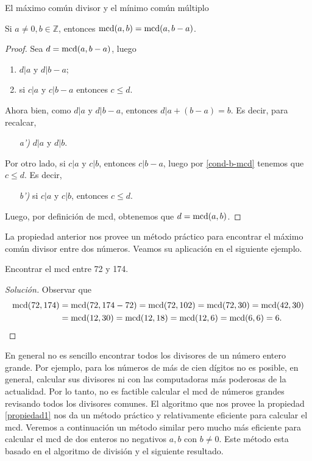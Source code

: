 \begin{section}{El máximo común divisor y el mínimo común múltiplo}
\begin{propiedad}\label{propiedad1}
    Si $a \not=0, b \in \mathbb Z$, entonces $\operatorname{mcd}(a,b) = \operatorname{mcd}(a,b-a)$. 
\end{propiedad}
\begin{proof}
    Sea $d =  \operatorname{mcd}(a,b-a)$, luego 
    \begin{enumerate}[label=\textit{\alph*)}]
        \item $ d|a$ y $d|b -a$;
        \item\label{cond-b-mcd} si $ c|a $ y $c|b -a$ entonces $ c \le d$.
    \end{enumerate}
    Ahora bien, como  $ d|a$ y $d|b -a$, entonces $  d|a +(b -a) = b$. Es decir, para recalcar,
    \begin{enumerate}
        \item[\textit{a')}] $ d|a$ y $d|b$.
    \end{enumerate}
    Por otro lado, si  $ c|a $ y $c|b$, entonces  $c|b -a$, luego por \ref{cond-b-mcd} tenemos que $c\le d$. Es decir, 
    \begin{enumerate}
        \item[\textit{b')}]si  $ c|a $ y $c|b$, entonces  $c \le d$.
    \end{enumerate}
    Luego, por definición de mcd, obtenemos que $d = \operatorname{mcd}(a,b)$.
\end{proof}

La propiedad anterior nos provee un método práctico para encontrar el máximo común divisor entre dos números. Veamos su aplicación en el siguiente ejemplo.

\begin{ejemplo*} Encontrar el mcd entre 72 y 174.
    \begin{proof}[Solución] Observar que 
        \begin{align*}
        \operatorname{mcd}(72, 174) &= \operatorname{mcd}(72,174-72) = \operatorname{mcd}(72,102) = \operatorname{mcd}(72,30) =  \operatorname{mcd}(42, 30) \\&= \operatorname{mcd}(12,30) = \operatorname{mcd}(12,18)= \operatorname{mcd}(12,6)= \operatorname{mcd}(6,6) = 6.  
        \end{align*}
    \end{proof}
\end{ejemplo*} 

En  general no es sencillo encontrar todos los divisores de un número entero grande. Por ejemplo, para los  números de más de cien dígitos no es posible,  en general, calcular sus divisores ni con las computadoras más poderosas de la actualidad. Por  lo tanto, no es factible calcular el  mcd de números grandes revisando todos los divisores comunes.  El algoritmo que nos provee la  propiedad \ref{propiedad1} nos da un método práctico y relativamente eficiente para calcular el mcd. Veremos a continuación un método similar pero mucho más eficiente para calcular el mcd de dos enteros no negativos $a,b$ con $b \not=0$. Este método esta basado en el algoritmo de división y el siguiente resultado.


\end{section}
